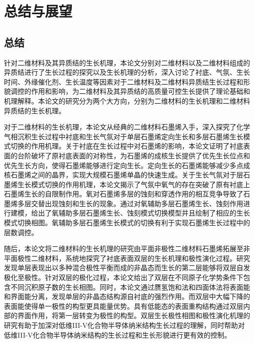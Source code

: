 
\chapter{总结与展望}
\section{总结}
针对二维材料及其异质结的生长机理，本论文分别对二维材料以及二维材料组成的异质结进行了生长过程的探究以及生长机理的分析，深入讨论了衬底、气氛、生长时间、外缘催化剂、生长温度等因素对于二维材料及二维材料异质结生长过程和形貌调控的作用和影响，为二维材料及其异质结的高质量可控生长提供了理论基础和机理解释。本论文的研究分为两个大方向，分别为二维材料的生长机理和二维材料异质结的生长机理。

对于二维材料的生长机理，本论文从经典的二维材料石墨烯入手，深入探究了化学气相沉积生长过程中衬底和生长气氛对于单层石墨烯定向生长和多层石墨烯生长模式切换的作用机理。关于衬底在生长过程中对石墨烯的影响，本论文证明了衬底表面的台阶破坏了原衬底表面的对称性，为石墨烯的成核生长提供了优先生长位点和优先生长方向，使得石墨烯能够进行定向生长。定向生长的石墨烯能够减少多点成核石墨烯之间的晶界，实现大规模石墨烯单晶的快速生成。关于生长气氛对于层石墨烯生长模式切换的作用机理，本论文揭示了气氛中氧气的存在突破了原有衬底上石墨烯生长的自限制作用。氧对石墨烯多层的蚀刻和穿透作用的相互竞争导致了石墨烯多层交替出现蚀刻和生长的现象。通过对氧辅助多层石墨烯生长、蚀刻作用进行建模，给出了氧辅助多层石墨烯生长、蚀刻模式切换模型并且绘制了相应的生长模式切换相图。氧辅助多层石墨烯生长模式的切换有利于实现石墨烯生长过程中的层数调控。

随后，本论文将二维材料的生长机理的研究由平面非极性二维材料石墨烯拓展至非平面极性二维材料，系统地探究了衬底表面双层的生长机理和极性演化过程。研究发现单层表现出以多种混合极性平衡而成的非晶态而生长的第二层能够将双层自发极化至极性。针对双层的极化过程，本论文给出了双层在不同原子化学势条件下包含不同沉积原子数的生长相图。同时，本论文通过赝氢饱和法和四面体法将表面能和界面能分离，发现单层的非晶态结构源自衬底的强烈作用。而双层中大幅下降的表面能使得单一极性的构型更具能量优势。具有低能态的表面重构结构通过双层内部的界面作用，将第一层转变为极性的构型。双层生长极性相图和极性演化机理的研究有助于加深对低维III-V化合物半导体纳米结构生长过程的理解，同时帮助对低维III-V化合物半导体纳米结构的生长过程和生长形貌进行更有效的控制。

